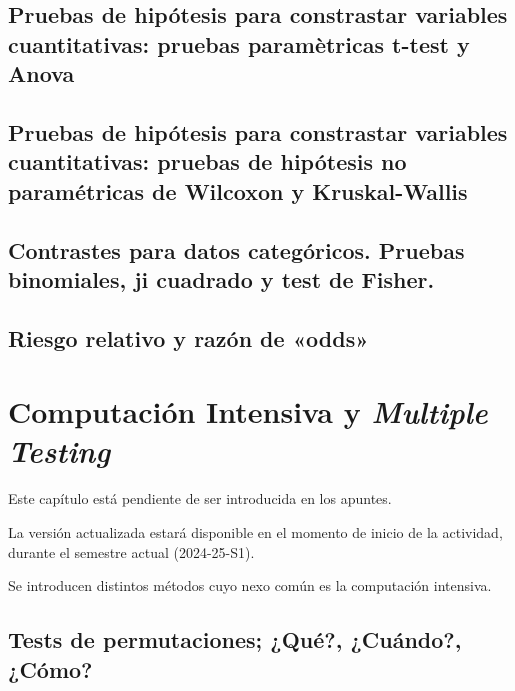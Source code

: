 \documentclass[
  a4paper,
  DIV=11,
  numbers=noendperiod]{scrreprt}
\begin{document}
\section{Pruebas de hipótesis para constrastar variables cuantitativas:
pruebas paramètricas t-test y
Anova}\label{pruebas-de-hipuxf3tesis-para-constrastar-variables-cuantitativas-pruebas-paramuxe8tricas-t-test-y-anova}

\section{Pruebas de hipótesis para constrastar variables cuantitativas:
pruebas de hipótesis no paramétricas de Wilcoxon y
Kruskal-Wallis}\label{pruebas-de-hipuxf3tesis-para-constrastar-variables-cuantitativas-pruebas-de-hipuxf3tesis-no-paramuxe9tricas-de-wilcoxon-y-kruskal-wallis}

\section{Contrastes para datos categóricos. Pruebas binomiales, ji
cuadrado y test de
Fisher.}\label{contrastes-para-datos-categuxf3ricos.-pruebas-binomiales-ji-cuadrado-y-test-de-fisher.}

\section{Riesgo relativo y razón de
«odds»}\label{riesgo-relativo-y-razuxf3n-de-odds}


\chapter{\texorpdfstring{Computación Intensiva y \emph{Multiple
Testing}}{Computación Intensiva y Multiple Testing}}\label{computaciuxf3n-intensiva-y-multiple-testing}

Este capítulo está pendiente de ser introducida en los apuntes.

La versión actualizada estará disponible en el momento de inicio de la
actividad, durante el semestre actual (2024-25-S1).

Se introducen distintos métodos cuyo nexo común es la computación
intensiva.

\section{Tests de permutaciones; ¿Qué?, ¿Cuándo?,
¿Cómo?}\label{tests-de-permutaciones-quuxe9-cuuxe1ndo-cuxf3mo}
\end{document}
